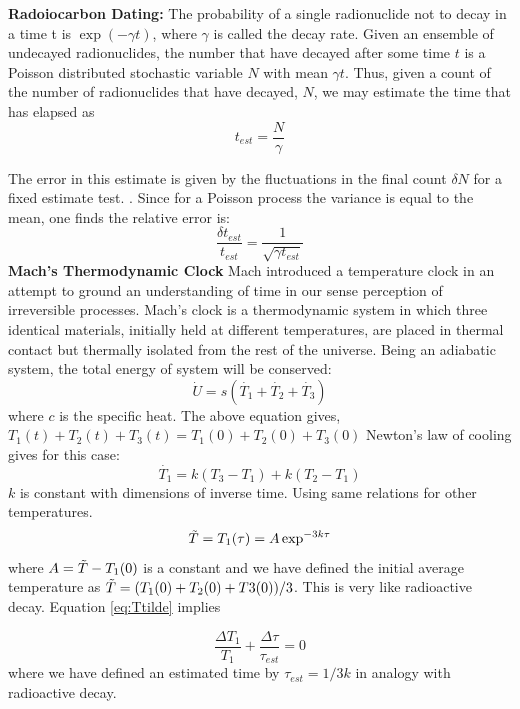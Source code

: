 \documentclass[%
 aapm,
 mph,%
 amsmath,amssymb,
 reprint,%
]{revtex4-2}
\begin{document}
\textbf{Radoiocarbon Dating:} The probability of a single radionuclide not to decay in a time t is $\exp(-\gamma t)$, where $\gamma$ is called the decay rate. Given an ensemble of undecayed radionuclides, the number that have decayed after some time $t$
is a Poisson distributed stochastic variable $N$ with mean
$\gamma t$. Thus, given a count of the number of radionuclides
that have decayed, $N$, we may estimate the time that has
elapsed as
\begin{equation}
    t_{est} = \frac{N}{\gamma}
\end{equation}

The error in this estimate is given by the fluctuations in
the final count $\delta N$ for a fixed estimate test. . Since for a Poisson process the variance is equal to the mean, one
finds the relative error is:
\begin{equation}
    \frac{\delta t_{est}}{t_{est}} = \frac{1}{\sqrt{\gamma t_{est}}}
\end{equation}
\textbf{Mach's Thermodynamic Clock}
Mach introduced a temperature clock in an attempt to ground an understanding of time in our sense perception of irreversible processes. Mach’s clock is a thermodynamic system in which three identical materials, initially held at different temperatures, are placed in thermal contact but thermally isolated from the rest of the universe. 
Being an adiabatic system, the total energy of system will be conserved: 
\begin{equation}
    \dot{U} = s\left(\dot{T_1} +\dot{T_2} +\dot{T_3} \right)
\end{equation}
where $c$ is the specific heat. The above equation gives, \(
T_1(t) + T_2(t) + T_3(t) = T_1(0) + T_2(0) + T_3(0)
\)
Newton's law of cooling gives for this case: 
\begin{equation}
    \dot{T_1} = k(T_3 - T_1) + k (T_2- T_1)
\end{equation}
$k$ is constant with dimensions of inverse time. Using same relations for other temperatures.
\begin{equation}\label{eq:Ttilde}
    \Tilde{T} = T_1 (\tau)  = A \exp ^{-3 k \tau}
\end{equation}
where $A =  \Tilde{T} - T_1(0)$ is a constant and we have defined
the initial average temperature as  $\Tilde{T} = (T_1(0) + T_2(0) +T3(0))/3$. This is very like radioactive decay. Equation \ref{eq:Ttilde} implies

\begin{equation}
\frac{\Delta T_1}{T_1} + \frac{\Delta \tau}{\tau _{est}} = 0
\end{equation}
where we have defined an estimated time by $\tau _{est} = 1/{3k}$ in
analogy with radioactive decay. \cite{optomechanicalclock}
\end{document}
